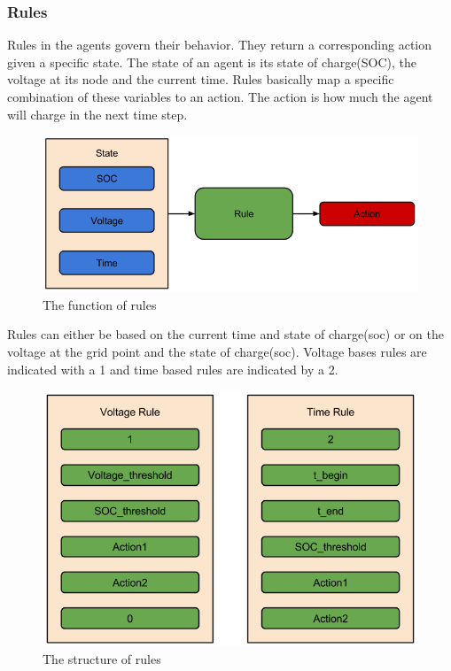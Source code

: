 \documentclass[a4paper]{article}
\begin{document}
\subsubsection{Rules}
Rules in the agents govern their behavior. They return a corresponding action given a specific state. The state of
an agent is its state of charge(SOC), the voltage at its node and the current time. Rules basically map a specific 
combination of these variables to an action. The action is how much the agent will charge in the next time step. 
\begin{figure}[!ht]
\includegraphics[width =\textwidth]{concept_rules_function.png}
\caption{The function of rules}
\label{rules_function}
\end{figure}

Rules can either be based on the current time and state of charge(soc) or on the voltage at the grid point and 
the state of charge(soc). Voltage bases rules are indicated with a 1 and time based rules are indicated by a 2.

\begin{figure}[!ht]
\includegraphics[width =\textwidth]{concept_rules_structure.png}
\caption{The structure of rules}
\label{rules_structure}
\end{figure}
\end{document}
